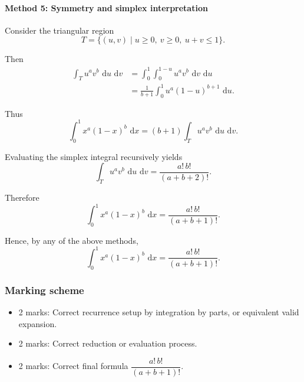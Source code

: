 \documentclass[12pt]{article}
\newcommand{\dd}{\,\mathrm{d}}
\begin{document}
\paragraph{Method 5: Symmetry and simplex interpretation}

Consider the triangular region
\[
T=\{(u,v)\mid u\ge0,\ v\ge0,\ u+v\le1\}.
\]

Then
\begin{align*}
\int_T u^a v^b\,\dd u\,\dd v
&=\int_0^1\int_0^{1-u}u^a v^b\,\dd v\,\dd u \\
&=\frac{1}{b+1}\int_0^1 u^a(1-u)^{b+1}\,\dd u.
\end{align*}

Thus
\[
\int_0^1 x^a(1-x)^b\,\dd x
=(b+1)\int_T u^a v^b\,\dd u\,\dd v.
\]

Evaluating the simplex integral recursively yields
\[
\int_T u^a v^b\,\dd u\,\dd v
=\frac{a!\,b!}{(a+b+2)!}.
\]

Therefore
\[
\int_0^1 x^a(1-x)^b\,\dd x
=\frac{a!\,b!}{(a+b+1)!}.
\]

\bigskip

Hence, by any of the above methods,
\[
\boxed{\int_0^1 x^a(1-x)^b\,\dd x=\frac{a!\,b!}{(a+b+1)!}.}\]

\subsubsection{Marking scheme}
\begin{itemize}
\item 2 marks: Correct recurrence setup by integration by parts, or equivalent valid expansion.
\item 2 marks: Correct reduction or evaluation process.
\item 2 marks: Correct final formula \(\dfrac{a!\,b!}{(a+b+1)!}\).
\end{itemize}
\end{document}
